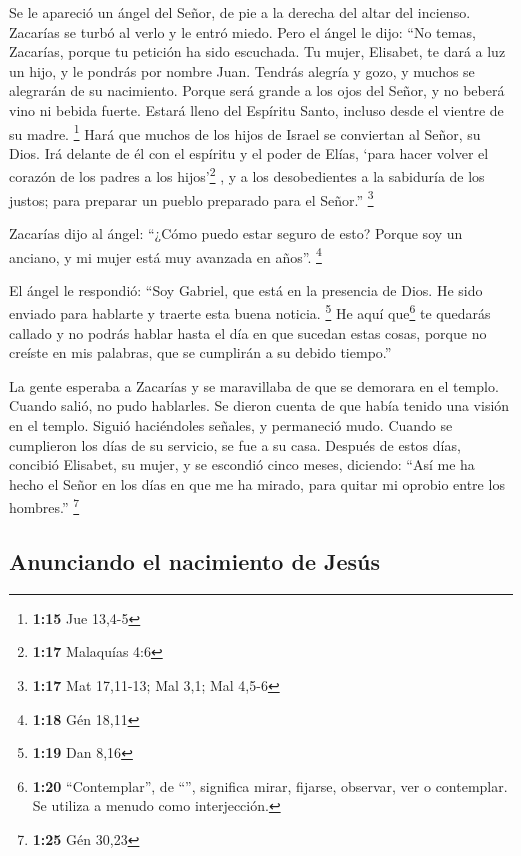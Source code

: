  Se le apareció un ángel del Señor, de pie a la derecha
del altar del incienso.  Zacarías se turbó al verlo y le
entró miedo.  Pero el ángel le dijo: ``No temas,
Zacarías, porque tu petición ha sido escuchada. Tu mujer, Elisabet, te
dará a luz un hijo, y le pondrás por nombre Juan. 
Tendrás alegría y gozo, y muchos se alegrarán de su nacimiento.
 Porque será grande a los ojos del Señor, y no beberá
vino ni bebida fuerte. Estará lleno del Espíritu Santo, incluso desde el
vientre de su madre. \footnote{\textbf{1:15} Jue 13,4-5} 
Hará que muchos de los hijos de Israel se conviertan al Señor, su Dios.
 Irá delante de él con el espíritu y el poder de Elías,
`para hacer volver el corazón de los padres a los hijos'\footnote{\textbf{1:17}
  Malaquías 4:6} , y a los desobedientes a la sabiduría de los justos;
para preparar un pueblo preparado para el Señor.'' \footnote{\textbf{1:17}
  Mat 17,11-13; Mal 3,1; Mal 4,5-6}

 Zacarías dijo al ángel: ``¿Cómo puedo estar seguro de
esto? Porque soy un anciano, y mi mujer está muy avanzada en años''.
\footnote{\textbf{1:18} Gén 18,11}

 El ángel le respondió: ``Soy Gabriel, que está en la
presencia de Dios. He sido enviado para hablarte y traerte esta buena
noticia. \footnote{\textbf{1:19} Dan 8,16}  He aquí
que\footnote{\textbf{1:20} ``Contemplar'', de ``'',
  significa mirar, fijarse, observar, ver o contemplar. Se utiliza a
  menudo como interjección.} te quedarás callado y no podrás hablar
hasta el día en que sucedan estas cosas, porque no creíste en mis
palabras, que se cumplirán a su debido tiempo.''

 La gente esperaba a Zacarías y se maravillaba de que se
demorara en el templo.  Cuando salió, no pudo hablarles.
Se dieron cuenta de que había tenido una visión en el templo. Siguió
haciéndoles señales, y permaneció mudo.  Cuando se
cumplieron los días de su servicio, se fue a su casa. 
Después de estos días, concibió Elisabet, su mujer, y se escondió cinco
meses, diciendo:  ``Así me ha hecho el Señor en los días
en que me ha mirado, para quitar mi oprobio entre los hombres.''
\footnote{\textbf{1:25} Gén 30,23}

\hypertarget{anunciando-el-nacimiento-de-jesuxfas}{%
\subsection{Anunciando el nacimiento de
Jesús}\label{anunciando-el-nacimiento-de-jesuxfas}}

